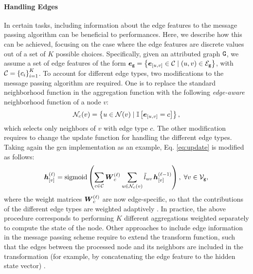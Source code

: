 \paragraph{Handling Edges}
In certain tasks, including information about the edge features to the message passing algorithm can be beneficial to performances. Here, we describe how this can be achieved, focusing on the case where the edge features are discrete values out of a set of $K$ possible choices. Specifically, given an attributed graph $\AttrGraph{g}$, we assume a set of edge features of the form $\GraphFeatures{e}{g} = \Set{\Elem{e}{u,v} \in \Cal{C} \mid (u, v) \in \Edges{g}}$, with $\Cal{C} = \Set{c_i}_{i=1}^K$. To account for different edge types, two modifications to the message passing algorithm are required. One is to replace the standard neighborhood function in the aggregation function with the following \emph{edge-aware} neighborhood function of a node $v$:
$$\Neigh_c(v) = \Set{u \in \Neigh(v) \mid \Indicator{\Elem{e}{u, v} = c}},$$
which selects only neighbors of $v$ with edge type $c$. The other modification requires to change the update function for handling the different edge types. Taking again the \gls{gcn} implementation as an example, Eq. \ref{eq:update} is modified as follows:
\begin{align*}
    \StateVector{v}{\ell} = \sigmoid\Par{\sum_{c \in \Cal{C}} \LayerMatrix{w}{\ell}_c \sum_{u \in \Neigh_c(v)} \tilde{l}_{uv}\,\Elem{h}{v}^{(\ell-1)}},\; \forall v \in \Nodes{g},
\end{align*}
where the weight matrices $\LayerMatrix{w}{\ell}_c $ are now edge-specific, so that the contributions of the different edge types are weighted adaptively \citep{micheli2009nn4g,schlichtkrull2018relationaldatagcn}. In practice, the above procedure corresponds to performing $K$ different aggregations weighted separately to compute the state of the node. Other approaches to include edge information in the message passing scheme require to extend the transform function, such that the edges between the processed node and its neighbors are included in the transformation (for example, by concatenating the edge feature to the hidden state vector) \cite{gilmer2017neuralmessagepassing}.

